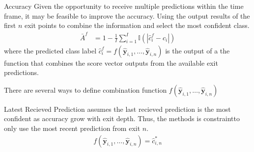 \begin{enumdescript}
\begin{enumdescript}
	\end{enumdescript}
	
	\item[Accuracy] Given the opportunity to receive multiple predictions within the time frame, it may be feasible to improve the accuracy. Using the output results of the first $ n $ exit points to combine the information and select the most confident class. 
	\begin{align}
	\bar{A}^f &= 1 - \frac{1}{I} \sum_{i=1}^{I}\mathbb{I}\left(\left|\hat{c}_i^f-c_i\right|\right)
	\end{align}
	where the predicted class label $ \hat{c}_i^f = f(\bm{\hat{y}}_{i,1},\dots, \bm{\hat{y}}_{i,n}) $ is the output of a the function that combines the score vector outputs from the available exit predictions. 
	
	There are several ways to define combination function $ f\left(\bm{\hat{y}}_{i,1}, \dots, \bm{\hat{y}}_{i,n}\right) $
	\begin{enumdescript}
		
		\item[Latest Recieved Prediction] assumes the last recieved prediction is the most confident as accuracy grow with exit depth. Thus, the methods is constraintto only use the most recent prediction from exit $n$.
		\begin{align}
		f\left(\bm{\hat{y}}_{i,1}, \dots, \bm{\hat{y}}_{i,n} \right) = \hat{c}_{i,n}^{*}
		\end{align}
		

\end{enumdescript}
\end{enumdescript}
